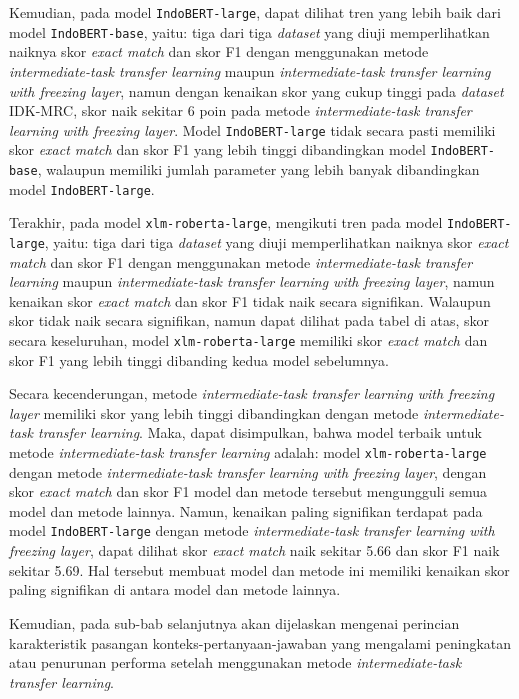 Kemudian, pada model \texttt{IndoBERT-large}, dapat dilihat tren yang lebih baik dari model \texttt{IndoBERT-base}, yaitu: tiga dari tiga \emph{dataset} yang diuji memperlihatkan naiknya skor \emph{exact match} dan skor F1 dengan menggunakan metode \emph{intermediate-task transfer learning} maupun \emph{intermediate-task transfer learning with freezing layer}, namun dengan kenaikan skor yang cukup tinggi pada \emph{dataset} IDK-MRC, skor naik sekitar 6 poin pada metode \emph{intermediate-task transfer learning with freezing layer}. Model \texttt{IndoBERT-large} tidak secara pasti memiliki skor \emph{exact match} dan skor F1 yang lebih tinggi dibandingkan model \texttt{IndoBERT-base}, walaupun memiliki jumlah parameter yang lebih banyak dibandingkan model \texttt{IndoBERT-large}.

Terakhir, pada model \texttt{xlm-roberta-large}, mengikuti tren pada model \texttt{IndoBERT-large}, yaitu: tiga dari tiga \emph{dataset} yang diuji memperlihatkan naiknya skor \emph{exact match} dan skor F1 dengan menggunakan metode \emph{intermediate-task transfer learning} maupun \emph{intermediate-task transfer learning with freezing layer}, namun kenaikan skor \emph{exact match} dan skor F1 tidak naik secara signifikan. Walaupun skor tidak naik secara signifikan, namun dapat dilihat pada tabel di atas, skor secara keseluruhan, model \texttt{xlm-roberta-large} memiliki skor \emph{exact match} dan skor F1 yang lebih tinggi dibanding kedua model sebelumnya.

Secara kecenderungan, metode \emph{intermediate-task transfer learning with freezing layer} memiliki skor yang lebih tinggi dibandingkan dengan metode \emph{intermediate-task transfer learning}. Maka, dapat disimpulkan, bahwa model terbaik untuk metode \emph{intermediate-task transfer learning} adalah: model \texttt{xlm-roberta-large} dengan metode \emph{intermediate-task transfer learning with freezing layer}, dengan skor \emph{exact match} dan skor F1 model dan metode tersebut mengungguli semua model dan metode lainnya. Namun, kenaikan paling signifikan terdapat pada model \texttt{IndoBERT-large} dengan metode \emph{intermediate-task transfer learning with freezing layer}, dapat dilihat skor \emph{exact match} naik sekitar 5.66 dan skor F1 naik sekitar 5.69. Hal tersebut membuat model dan metode ini memiliki kenaikan skor paling signifikan di antara model dan metode lainnya. 

Kemudian, pada sub-bab selanjutnya akan dijelaskan mengenai perincian karakteristik pasangan konteks-pertanyaan-jawaban yang mengalami peningkatan atau penurunan performa setelah menggunakan metode \emph{intermediate-task transfer learning}.

